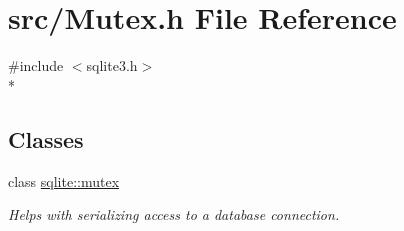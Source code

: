 \hypertarget{a00027}{\section{src/\-Mutex.h File Reference}
\label{a00027}
}
{\ttfamily \#include $<$sqlite3.\-h$>$}\\*
\subsection*{Classes}
\begin{DoxyCompactItemize}
\item 
class \hyperlink{a00009}{sqlite\-::mutex}
\begin{DoxyCompactList}\small\item\em Helps with serializing access to a database connection. \end{DoxyCompactList}\end{DoxyCompactItemize}
